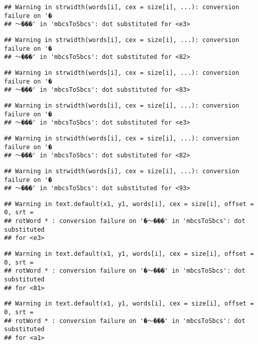 \documentclass[]{article}
\begin{document}
\begin{verbatim}
## Warning in strwidth(words[i], cex = size[i], ...): conversion failure on '�
## ～���' in 'mbcsToSbcs': dot substituted for <e3>
\end{verbatim}

\begin{verbatim}
## Warning in strwidth(words[i], cex = size[i], ...): conversion failure on '�
## ～���' in 'mbcsToSbcs': dot substituted for <82>
\end{verbatim}

\begin{verbatim}
## Warning in strwidth(words[i], cex = size[i], ...): conversion failure on '�
## ～���' in 'mbcsToSbcs': dot substituted for <83>
\end{verbatim}

\begin{verbatim}
## Warning in strwidth(words[i], cex = size[i], ...): conversion failure on '�
## ～���' in 'mbcsToSbcs': dot substituted for <e3>
\end{verbatim}

\begin{verbatim}
## Warning in strwidth(words[i], cex = size[i], ...): conversion failure on '�
## ～���' in 'mbcsToSbcs': dot substituted for <82>
\end{verbatim}

\begin{verbatim}
## Warning in strwidth(words[i], cex = size[i], ...): conversion failure on '�
## ～���' in 'mbcsToSbcs': dot substituted for <93>
\end{verbatim}

\begin{verbatim}
## Warning in text.default(x1, y1, words[i], cex = size[i], offset = 0, srt =
## rotWord * : conversion failure on '�～���' in 'mbcsToSbcs': dot substituted
## for <e3>
\end{verbatim}

\begin{verbatim}
## Warning in text.default(x1, y1, words[i], cex = size[i], offset = 0, srt =
## rotWord * : conversion failure on '�～���' in 'mbcsToSbcs': dot substituted
## for <81>
\end{verbatim}

\begin{verbatim}
## Warning in text.default(x1, y1, words[i], cex = size[i], offset = 0, srt =
## rotWord * : conversion failure on '�～���' in 'mbcsToSbcs': dot substituted
## for <a1>
\end{verbatim}
\end{document}
